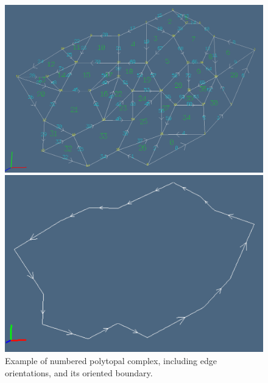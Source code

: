 \documentclass[11pt,oneside]{article}	%
\begin{document}
\begin{figure}[htbp] %
   \centering
   \includegraphics[width=0.9\linewidth]{images/numberedcomplex} 
   
   \includegraphics[width=0.9\linewidth]{images/numberedcomplex1} 
   \caption{Example of numbered polytopal complex, including edge orientations, and its oriented boundary.}
   \label{numberedcomplex}
\end{figure}
\end{document}
